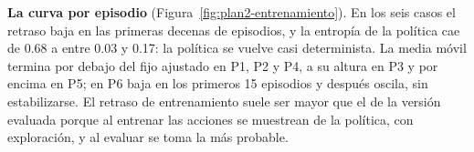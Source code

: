 \noindent\textbf{La curva por episodio}
(Figura~\ref{fig:plan2-entrenamiento}). En los seis casos el retraso
baja en las primeras decenas de episodios, y la entropía de la política
cae de 0.68 a entre 0.03 y 0.17: la política se vuelve casi
determinista. La media móvil termina por debajo del fijo ajustado en P1,
P2 y P4, a su altura en P3 y por encima en P5; en P6 baja en los
primeros 15 episodios y después oscila, sin estabilizarse. El retraso de
entrenamiento suele ser mayor que el de la versión evaluada porque al
entrenar las acciones se muestrean de la política, con exploración, y
al evaluar se toma la más probable.

